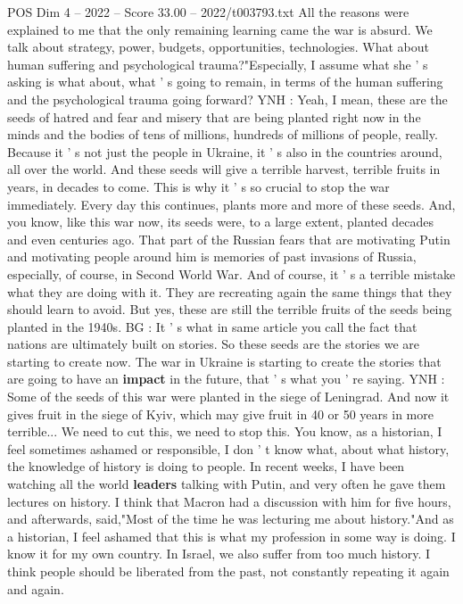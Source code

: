 \begin{textsample}{POS Dim 4 – 2022 – Score 33.00 – 2022/t003793.txt}
All the reasons were explained to me that the only remaining learning came the war is absurd.
We talk about strategy, power, budgets, opportunities, technologies.
What about human suffering and psychological trauma?"Especially, I assume what she ' s asking is what about, what ' s going to remain, in terms of the human suffering and the psychological trauma going forward?
YNH : Yeah, I mean, these are the seeds of hatred and fear and misery that are being planted right now in the minds and the bodies of tens of millions, hundreds of millions of people, really.
Because it ' s not just the people in Ukraine, it ' s also in the countries around, all over the world.
And these seeds will give a terrible harvest, terrible fruits in years, in decades to come.
This is why it ' s so crucial to stop the war immediately.
Every day this continues, plants more and more of these seeds.
And, you know, like this war now, its seeds were, to a large extent, planted decades and even centuries ago.
That part of the Russian fears that are motivating Putin and motivating people around him is memories of past invasions of Russia, especially, of course, in Second World War.
And of course, it ' s a terrible mistake what they are doing with it.
They are recreating again the same things that they should learn to avoid.
But yes, these are still the terrible fruits of the seeds being planted in the 1940s.
BG : It ' s what in same article you call the fact that nations are ultimately built on stories.
So these seeds are the stories we are starting to create now.
The war in Ukraine is starting to create the stories that are going to have an \textbf{impact} in the future, that ' s what you ' re saying.
YNH : Some of the seeds of this war were planted in the siege of Leningrad.
And now it gives fruit in the siege of Kyiv, which may give fruit in 40 or 50 years in more terrible...
We need to cut this, we need to stop this.
You know, as a historian, I feel sometimes ashamed or responsible, I don ' t know what, about what history, the knowledge of history is doing to people.
In recent weeks, I have been watching all the world \textbf{leaders} talking with Putin, and very often he gave them lectures on history.
I think that Macron had a discussion with him for five hours, and afterwards, said,"Most of the time he was lecturing me about history."And as a historian, I feel ashamed that this is what my profession in some way is doing.
I know it for my own country.
In Israel, we also suffer from too much history.
I think people should be liberated from the past, not constantly repeating it again and again.

\end{textsample}
